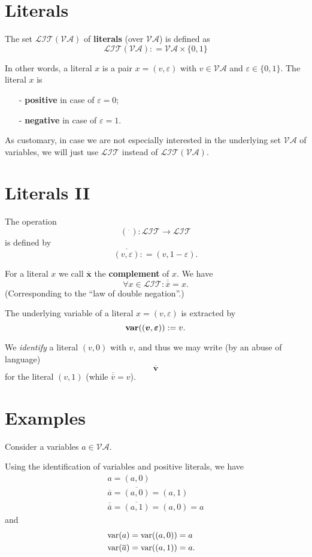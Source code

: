 \documentclass{article}
\def\mva{{\mathcal{VA}}}
\def\mlit{{\mathcal{LIT}}}
\def\pmva{{\pmb{\mathcal{VA}}}}
\def\pmlit{{\pmb{\mathcal{LIT}}}}
\def\var{{\rm var}}
\def\bvar{{\bf var}}
\begin{document}
\section{Literals}%

The set $\pmlit(\pmva)$ of \textbf{literals} (over $\mva$) is defined as
\[
\pmlit(\pmva): = \mva \times \{0,1\}
\]

In other words, a literal $x$ is a pair $x = (v, \varepsilon)$ with $v \in \mva$ and $\varepsilon\in \{0,1\}$. The literal $x$ is
\begin{itemize}
\item[-] \textbf{positive} in case of $\varepsilon = 0$;
\item[-] \textbf{negative} in case of $\varepsilon = 1$.
\end{itemize}

As customary, in case we are not especially interested in the underlying set $\mva$ of variables, we will just use $\mlit$ instead of $\mlit(\mva)$.

\section{Literals II}%

The operation
\[
({}^{\overline{~~}}): \mlit \to \mlit
\]
is defined by
\[
\overline{(v, \varepsilon)}: = (v, 1-\varepsilon).
\]

For a literal $x$ we call $\overline{{\bm x}}$ the \textbf{complement} of $x$. We have
\[
\forall x \in \mlit: \overline{\overline{x}} = x.
\]
(Corresponding to the ``law of double negation''.)

The underlying variable of a literal $x = (v,\varepsilon)$ is extracted by
\[
\bvar(({\bm v}, {\bm \varepsilon})): = v.
\]

We \textit{identify} a literal $(v,0)$ with $v$, and thus we may write (by an abuse of language)
\[
\overline{{\bm v}}
\]
for the literal $(v, 1)$ (while $\overline{\overline{v}} = v$).

\section{Examples}%

Consider a variables $a\in \mva$.

Using the identification of variables and positive literals, we have
\begin{eqnarray*}
&a = (a,0)& \\
&\overline{a} = \overline{(a,0)} = (a,1)&\\
&\overline{\overline{a}} = \overline{(a,1)} = (a,0) = a&
\end{eqnarray*}
and
\begin{eqnarray*}
&\var(a) = \var((a,0)) = a& \\
&\var(\overline{a}) = \var((a,1)) = a. &
\end{eqnarray*}
\end{document}
